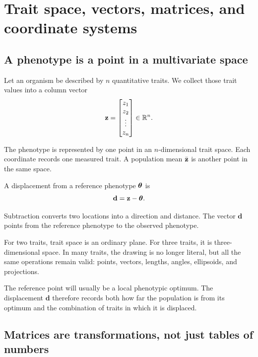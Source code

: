 \chapter{Trait space, vectors, matrices, and coordinate systems}

\section{A phenotype is a point in a multivariate space}

Let an organism be described by \(n\) quantitative traits. We collect those trait values into a column vector
\begin{equation}
\mathbf z=
\begin{bmatrix}
z_1\\ z_2\\ \vdots\\ z_n
\end{bmatrix}
\in\mathbb R^n.
\end{equation}

\inwords The phenotype is represented by one point in an \(n\)-dimensional trait space. Each coordinate records one measured trait. A population mean \(\bar{\mathbf z}\) is another point in the same space.

A displacement from a reference phenotype \(\boldsymbol{\theta}\) is
\begin{equation}
\mathbf d=\mathbf z-\boldsymbol{\theta}.
\end{equation}

\inwords Subtraction converts two locations into a direction and distance. The vector \(\mathbf d\) points from the reference phenotype to the observed phenotype.

\begin{geombox}
For two traits, trait space is an ordinary plane. For three traits, it is three-dimensional space. In many traits, the drawing is no longer literal, but all the same operations remain valid: points, vectors, lengths, angles, ellipsoids, and projections.
\end{geombox}

\begin{biobox}
The reference point will usually be a local phenotypic optimum. The displacement \(\mathbf d\) therefore records both how far the population is from its optimum and the combination of traits in which it is displaced.
\end{biobox}

\section{Matrices are transformations, not just tables of numbers}

